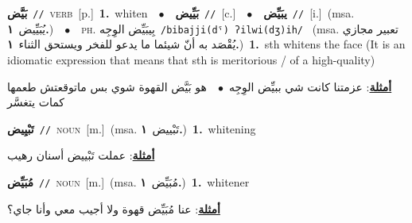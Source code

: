 \documentclass[10pt,a4paper,twoside]{article} %
\begin{document}
\begin{multicols}{2}
{\setlength\topsep{0pt}\textbf{\foreignlanguage{arabic}{بَيَّض}}\ {\color{gray}\texttt{//}\color{black}}\ \textsc{verb}\ [p.]\ \textbf{1.}~whiten\ \ $\bullet$\ \ \setlength\topsep{0pt}\textbf{\foreignlanguage{arabic}{بَيِّيض}}\ {\color{gray}\texttt{//}\color{black}}\ [c.]\ \ $\bullet$\ \ \setlength\topsep{0pt}\textbf{\foreignlanguage{arabic}{يبَيِّض}}\ {\color{gray}\texttt{//}\color{black}}\ [i.]\ \color{gray}(msa. \foreignlanguage{arabic}{يُبَيِّيض}~\foreignlanguage{arabic}{\textbf{١.}})\color{black}\ \ $\bullet$\ \ \textsc{ph.} \color{gray} \foreignlanguage{arabic}{بِيبَيِّض الوِجِه}\color{black}\ {\color{gray}\texttt{/{\sffamily bibajji(dˤ) ʔilwi(dʒ)ih}/}\color{black}}\ \color{gray} (msa. \foreignlanguage{arabic}{تعبير مجازي يُقْصَد به أنّ شيئما ما يدعو للفخر ويستحق الثناء}~\foreignlanguage{arabic}{\textbf{١.}})\color{black}\ \textbf{1.}~sth whitens the face (It is an idiomatic expression that means that sth is meritorious / of a high-quality)\  \begin{flushright}\color{gray}\foreignlanguage{arabic}{\textbf{\underline{\foreignlanguage{arabic}{أمثلة}}}: عزمتنا كانت شي ببيِّض الوِجِه\ $\bullet$\ \  هو بَيَّض القهوة شوي بس ماتوقعتش طعمها كمات يتغسَّر}\end{flushright}\color{black}} \vspace{2mm}

{\setlength\topsep{0pt}\textbf{\foreignlanguage{arabic}{تَبْيِيض}}\ {\color{gray}\texttt{//}\color{black}}\ \textsc{noun}\ [m.]\ \color{gray}(msa. \foreignlanguage{arabic}{تَبْييض}~\foreignlanguage{arabic}{\textbf{١.}})\color{black}\ \textbf{1.}~whitening\  \begin{flushright}\color{gray}\foreignlanguage{arabic}{\textbf{\underline{\foreignlanguage{arabic}{أمثلة}}}: عملت تَبْييض أسنان رهيب}\end{flushright}\color{black}} \vspace{2mm}

{\setlength\topsep{0pt}\textbf{\foreignlanguage{arabic}{مُبَيِّض}}\ {\color{gray}\texttt{//}\color{black}}\ \textsc{noun}\ [m.]\ \color{gray}(msa. \foreignlanguage{arabic}{مُبَيِّض}~\foreignlanguage{arabic}{\textbf{١.}})\color{black}\ \textbf{1.}~whitener\  \begin{flushright}\color{gray}\foreignlanguage{arabic}{\textbf{\underline{\foreignlanguage{arabic}{أمثلة}}}: عنا مُبَيِّض قهوة ولا أجيب معي وأنا جاي؟}\end{flushright}\color{black}} \vspace{2mm}


\end{multicols}
\end{document}
